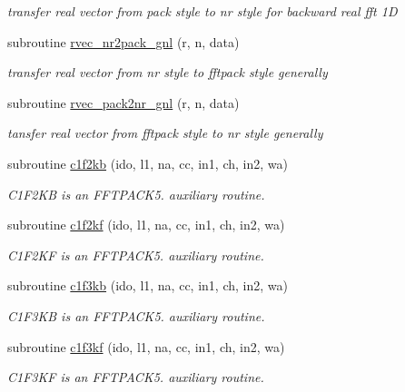 \begin{DoxyCompactItemize}
\begin{DoxyCompactList}\small\item\em transfer real vector from pack style to nr style for backward real fft 1D \end{DoxyCompactList}\item 
subroutine \mbox{\hyperlink{namespacefftclass_a2c47e8aa546c8ea9f5f23219be52d57e}{rvec\+\_\+nr2pack\+\_\+gnl}} (r, n, data)
\begin{DoxyCompactList}\small\item\em transfer real vector from nr style to fftpack style generally \end{DoxyCompactList}\item 
subroutine \mbox{\hyperlink{namespacefftclass_a5b968c02330134b7f60b0b19e3192e77}{rvec\+\_\+pack2nr\+\_\+gnl}} (r, n, data)
\begin{DoxyCompactList}\small\item\em tansfer real vector from fftpack style to nr style generally \end{DoxyCompactList}\item 
subroutine \mbox{\hyperlink{namespacefftclass_a5b4381756639205cdda3aa66b4d3e98c}{c1f2kb}} (ido, l1, na, cc, in1, ch, in2, wa)
\begin{DoxyCompactList}\small\item\em C1\+F2\+KB is an F\+F\+T\+P\+A\+C\+K5. auxiliary routine. \end{DoxyCompactList}\item 
subroutine \mbox{\hyperlink{namespacefftclass_a0535bb9fc14fda824be9053638cdfb2a}{c1f2kf}} (ido, l1, na, cc, in1, ch, in2, wa)
\begin{DoxyCompactList}\small\item\em C1\+F2\+KF is an F\+F\+T\+P\+A\+C\+K5. auxiliary routine. \end{DoxyCompactList}\item 
subroutine \mbox{\hyperlink{namespacefftclass_af43eb54e0a7553e31585e67ad240b860}{c1f3kb}} (ido, l1, na, cc, in1, ch, in2, wa)
\begin{DoxyCompactList}\small\item\em C1\+F3\+KB is an F\+F\+T\+P\+A\+C\+K5. auxiliary routine. \end{DoxyCompactList}\item 
subroutine \mbox{\hyperlink{namespacefftclass_ae586c2f39848274e0454c7d161522c31}{c1f3kf}} (ido, l1, na, cc, in1, ch, in2, wa)
\begin{DoxyCompactList}\small\item\em C1\+F3\+KF is an F\+F\+T\+P\+A\+C\+K5. auxiliary routine. \end{DoxyCompactList}\item 

\end{DoxyCompactItemize}
